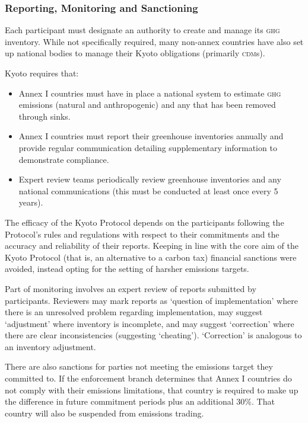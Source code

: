 \subsubsection{Reporting, Monitoring and Sanctioning}

Each participant must designate an authority to create and manage its \textsc{ghg} inventory. While not specifically required, many non-annex countries have also set up national bodies to manage their Kyoto obligations (primarily \textsc{cdm}s).

Kyoto requires that:~\cite{UNFCCC-Kyoto-guidelines}

\begin{itemize}
	\item Annex I countries must have in place a national system to estimate \textsc{ghg} emissions (natural and anthropogenic) and any \CO that has been removed through sinks.
	\item Annex I countries must report their greenhouse inventories annually and provide regular communication detailing supplementary information to demonstrate compliance.
	\item Expert review teams periodically review greenhouse inventories and any national communications (this must be conducted at least once every 5 years).
\end{itemize}

The efficacy of the Kyoto Protocol depends on the participants following the Protocol's rules and regulations with respect to their commitments and the accuracy and reliability of their reports. Keeping in line with the core aim of the Kyoto Protocol (that is, an alternative to a carbon tax) financial sanctions were avoided, instead opting for the setting of harsher emissions targets.

Part of monitoring involves an expert review of reports submitted by participants. Reviewers may mark reports as `question of implementation' where there is an unresolved problem regarding implementation, may suggest `adjustment' where inventory is incomplete, and may suggest `correction' where there are clear inconsistencies (suggesting `cheating'). `Correction' is analogous to an inventory adjustment.~\cite{UNFCCC-reporting-review}

There are also sanctions for parties not meeting the emissions target they committed to. If the enforcement branch determines that Annex I countries do not comply with their emissions limitations, that country is required to make up the difference in future commitment periods plus an additional 30\%. That country will also be suspended from emissions trading.~\cite{UNFCCC-compliance}

